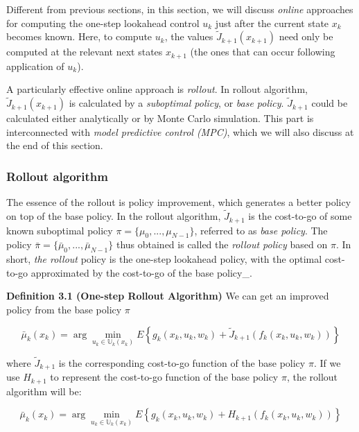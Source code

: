 \documentclass[
]{book}
\theoremstyle{definition}
\theoremstyle{definition}
\theoremstyle{definition}
\theoremstyle{definition}
\theoremstyle{remark}
\begin{document}
Different from previous sections, in this section, we will discuss \emph{online} approaches for computing the one-step lookahead control \(u_k\) just after the current state \(x_k\) becomes known. Here, to compute \(u_k\), the values \(\tilde J_{k+1} (x_{k+1})\) need only be computed at the relevant next states \(x_{k+1}\) (the ones that can occur following application of \(u_k\)).

A particularly effective online approach is \emph{rollout}. In rollout algorithm, \(\tilde J_{k+1}(x_{k+1})\) is calculated by a \emph{suboptimal policy}, or \emph{base policy}. \(\tilde J_{k+1}\) could be calculated either analytically or by Monte Carlo simulation. This part is interconnected with \emph{model predictive control (MPC)}, which we will also discuss at the end of this section.

\hypertarget{rollout-algorithm}{%
\subsubsection{Rollout algorithm}\label{rollout-algorithm}}

The essence of the rollout is policy improvement, which generates a better policy on top of the base policy. In the rollout algorithm, \(\tilde J_{k+1}\) is the cost-to-go of some known suboptimal policy \(\pi = \{\mu_0,...,\mu_{N-1}\}\), referred to as \emph{base policy}.
The policy \(\bar \pi=\{\bar\mu_0,...,\bar\mu_{N-1}\}\) thus obtained is called the \emph{rollout policy} based on \(\pi\). In short, \emph{the rollout} policy is the one-step lookahead policy, with the optimal cost-to-go approximated by the cost-to-go of the base policy\_.

\textbf{Definition 3.1 (One-step Rollout Algorithm)} We can get an improved policy from the base policy \(\pi\)

\begin{equation}
\bar\mu_k(x_k) = \arg\min_{u_k\in\mathbb U_k(x_k)} E\left\{g_k(x_k,u_k,w_k)+\tilde J_{k+1}(f_k(x_k,u_k,w_k))\right\} \label{eq:apprinv-rollout}
\end{equation}

where \(\tilde J_{k+1}\) is the corresponding cost-to-go function of the base policy \(\pi\). If we use \(H_{k+1}\) to represent the cost-to-go function of the base policy \(\pi\), the rollout algorithm will be:

\begin{equation}
\bar\mu_k(x_k) = \arg\min_{u_k\in\mathbb U_k(x_k)} E\left\{g_k(x_k,u_k,w_k)+H_{k+1}(f_k(x_k,u_k,w_k))\right\} \label{eq:apprinv-rollout-2}
\end{equation}
\end{document}

